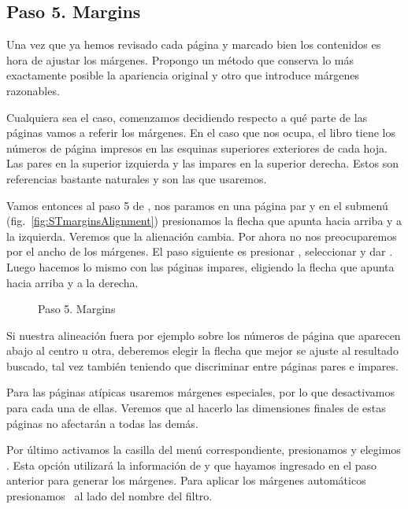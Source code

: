 \documentclass[%
	a5paper,
	10pt,
	twoside,
	openright,
	final,
]{memoir}
\begin{document}
{	\subsection{Paso 5. Margins\label{sec:STmargins}} Una vez que ya hemos revisado cada página y marcado bien los contenidos es hora de ajustar los márgenes. Propongo un método que conserva lo más exactamente posible la apariencia original y otro que introduce márgenes razonables.

	Cualquiera sea el caso, comenzamos decidiendo respecto a qué parte de las páginas vamos a referir los márgenes. En el caso que nos ocupa, el libro tiene los números de página impresos en las esquinas superiores exteriores de cada hoja. Las pares en la superior izquierda y las impares en la superior derecha. Estos son referencias bastante naturales y son las que usaremos.

	Vamos entonces al paso 5 de \scantailor, nos paramos en una página par y en el submenú  (fig.~\ref{fig:STmarginsAlignment}) presionamos la flecha que apunta hacia arriba y a la izquierda. Veremos que la alienación cambia. Por ahora no nos preocuparemos por el ancho de los márgenes. El paso siguiente es presionar , seleccionar  y dar . Luego hacemos lo mismo con las páginas impares, eligiendo la flecha que apunta hacia arriba y a la derecha.

	\begin{figure}
		\hfill
		\caption{Paso 5. Margins\label{fig:STmargins}}
	\end{figure}

	Si nuestra alineación fuera por ejemplo sobre los números de página que aparecen abajo al centro u otra, deberemos elegir la flecha que mejor se ajuste al resultado buscado, tal vez también teniendo que discriminar entre páginas pares e impares.

	Para las páginas atípicas usaremos márgenes especiales, por lo que desactivamos  para cada una de ellas. Veremos que al hacerlo las dimensiones finales de estas páginas no afectarán a todas las demás.

	Por último activamos la casilla  del menú correspondiente, presionamos  y elegimos . Esta opción utilizará la información de  y  que hayamos ingresado en el paso anterior para generar los márgenes. Para aplicar los márgenes automáticos presionamos \play\ al lado del nombre del filtro.

}
\end{document}
